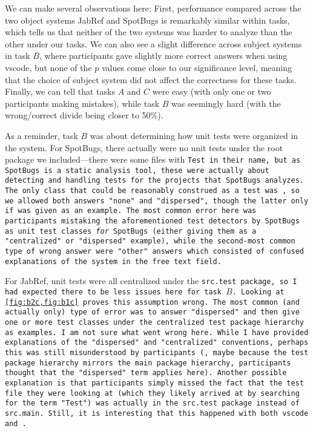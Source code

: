 \documentclass[../thesis]{subfiles}
\begin{document}
We can make several observations here:
First, performance compared across the two object systems JabRef and SpotBugs is remarkably similar within tasks, which tells us that neither of the two systems was harder to analyze than the other under our tasks.
We can also see a slight difference across subject systems in task $B$, where participants gave slightly more correct answers when using \gls{vscode}, but none of the $p$ values come close to our significance level, meaning that the choice of subject system did not affect the correctness for these tasks.
Finally, we can tell that tasks $A$ and $C$ were easy (with only one or two participants making mistakes), while task $B$ was seemingly hard (with the wrong/correct divide being closer to 50\%).

As a reminder, task $B$ was about determining how unit tests were organized in the system.
For SpotBugs, there actually were no unit tests under the root package we included---there were some files with \tt{Test} in their name, but as SpotBugs is a static analysis tool, these were actually about detecting and handling tests for the projects that SpotBugs analyzes.
The only class that could be reasonably construed as a test was , so we allowed both answers "none" and "dispersed", though the latter only if  was given as an example.
The most common error here was participants mistaking the aforementioned test detectors by SpotBugs as unit test classes \emph{for} SpotBugs (either giving them as a "centralized" or "dispersed" example), while the second-most common type of wrong answer were "other" answers which consisted of confused explanations of the system in the free text field.

For JabRef, unit tests were all centralized under the \tt{src.test} package, so I had expected there to be less issues here for task $B$.
Looking at \cref{fig:b2c,fig:b1c} proves this assumption wrong.
The most common (and actually only) type of error was to answer "dispersed" and then give one or more test classes under the centralized test package hierarchy as examples.
I am not sure what went wrong here.
While I have provided explanations of the "dispersed" and "centralized" conventions, perhaps this was still misunderstood by participants (\eg, maybe because the test package hierarchy mirrors the main package hierarchy, participants thought that the "dispersed" term applies here).
Another possible explanation is that participants simply missed the fact that the test file they were looking at (which they likely arrived at by searching for the term "Test") was actually in the \tt{src.test} package instead of \tt{src.main}.
Still, it is interesting that this happened with both \gls{vscode} and \SEE{}.
\end{document}
